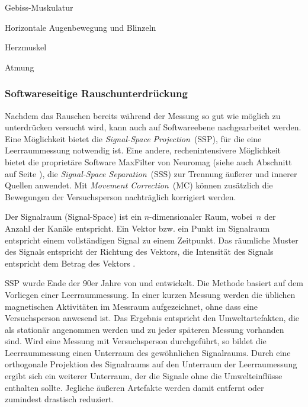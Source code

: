 \documentclass[doc,a4paper,12pt]{apa6}
\makeatletter
\DeclareRobustCommand*{\nameref}[1]{%
      \glqq{\myorg@nameref{#1}}\grqq%
    }%
\makeatother
\begin{document}
\begin{compactitem}
\item Gebiss-Muskulatur
\item Horizontale Augenbewegung und Blinzeln
\item Herzmuskel
\item Atmung
\end{compactitem}

\subsubsection{Softwareseitige Rauschunterdrückung}
\label{sec:maxfilter}

Nachdem das Rauschen bereits während der Messung so gut wie möglich zu unterdrücken versucht wird, kann auch auf Softwareebene nachgearbeitet werden. Eine Möglichkeit bietet die \emph{Signal-Space Projection}~(SSP), für die eine Leerraummessung notwendig ist. Eine andere, rechenintensivere Möglichkeit bietet die proprietäre Software MaxFilter von Neuromag (siehe auch Abschnitt \nameref{sec:software} auf Seite \pageref{sec:software}), die \emph{Signal-Space Separation}~(SSS) zur Trennung äußerer und innerer Quellen anwendet. Mit \emph{Movement Correction}~(MC) können zusätzlich die Bewegungen der Versuchsperson nachträglich korrigiert werden.

Der Signalraum (Signal-Space) ist ein $n$-dimensionaler Raum, wobei~$n$ der Anzahl der Kanäle entspricht. Ein Vektor bzw. ein Punkt im Signalraum entspricht einem vollständigen Signal zu einem Zeitpunkt. Das räumliche Muster des Signals entspricht der Richtung des Vektors, die Intensität des Signals entspricht dem Betrag des Vektors \parencite{hansen2010meg}.

SSP wurde Ende der 90er Jahre von \textcite{uusitalo1997signal} und \textcite{parkkonen1999interference} entwickelt. Die Methode basiert auf dem Vorliegen einer Leerraummessung. In einer kurzen Messung werden die üblichen magnetischen Aktivitäten im Messraum aufgezeichnet, ohne dass eine Versuchsperson anwesend ist. Das Ergebnis entspricht den Umweltartefakten, die als stationär angenommen werden und zu jeder späteren Messung vorhanden sind. Wird eine Messung mit Versuchsperson durchgeführt, so bildet die Leerraummessung einen Unterraum des gewöhnlichen Signalraums. Durch eine orthogonale Projektion des Signalraums auf den Unterraum der Leerraumessung ergibt sich ein weiterer Unterraum, der die Signale ohne die Umwelteinflüsse enthalten sollte. Jegliche äußeren Artefakte werden damit entfernt oder zumindest drastisch reduziert.
\end{document}
